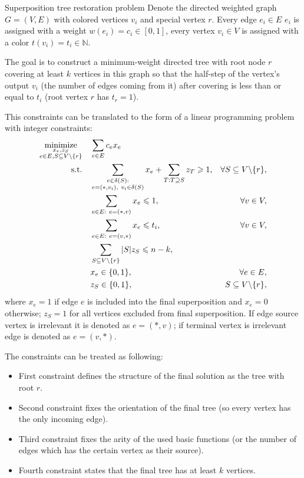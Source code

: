 \documentclass[11pt, tightenlines, twoside, onecolumn, nofloats, nobibnotes, nofootinbib, superscriptaddress, noshowpacks, centertags]{revtex4}
\begin{document}
\begin{definition}{Superposition tree restoration problem}
Denote the directed weighted graph $G=(V,E)$ with colored vertices $v_i$ and special vertex $r$. Every edge $e_i\in E$ $e_i$ is assigned with a weight $w(e_i)=c_i\in[0,1]$, every vertex $v_i \in V$ is assigned with a color  $t(v_i)=t_i\in\mathbb{N}$.

The goal is to construct a minimum-weight directed tree with root node $r$ covering at least $k$ vertices in this graph so that the half-step of the vertex's output $v_i$ (the number of edges coming from it) after covering is less than or equal to $t_i$ (root vertex $r$ has $t_r=1$).
\end{definition}
This constraints can be translated to the form of a linear programming problem with integer constraints:
\begin{align}
\underset{\substack{x_e,z_S \\ e\in E, S\subseteq V\backslash \{r\}}}{\text{minimize}}\quad & \sum\limits_{e\in E}c_ex_e \nonumber\\
\text{s.t.\quad} & \sum\limits_{\substack{e\in\delta(S):\\e=(\ast,v_i),~ v_i\in\delta(S)}}x_e + \sum\limits_{T:T\supseteq S}z_T\geqslant 1, & \forall S\subseteq V\backslash \{r\},\nonumber\\
& \sum\limits_{e\in E:~e=(\ast,v)}x_e\leqslant 1, & \forall v\in V,
\label{ilp_our}\\
& \sum\limits_{e\in E:~e=(v,\ast)}x_e\leqslant t_i, & \forall v\in V,\nonumber\\
& \sum\limits_{S\subseteq V\backslash \{r\}}|S|z_S \leqslant n-k,\nonumber\\
& x_e\in\{0,1\}, &\forall e\in E,\nonumber\\
& z_S\in\{0,1\}, & S\subseteq V\backslash \{r\},\nonumber
\end{align}
where $x_e = 1$ if edge $e$ is included into the final superposition and $x_e = 0$ otherwise; $z_S = 1$ for all vertices excluded from final superposition. If edge source vertex is irrelevant it is denoted as $e=(\ast, v)$; if terminal vertex is irrelevant edge is denoted as $e=(v, \ast)$.

The constraints can be treated as following:
\begin{itemize}
    \item First constraint defines the structure of the final solution as the tree with root $r$.
    \item Second constraint fixes the orientation of the final tree (so every vertex has the only incoming edge).
    \item Third constraint fixes the arity of the used basic functions (or the number of edges which has the certain vertex as their source).
    \item Fourth constraint states that the final tree has at least $k$ vertices.
\end{itemize}
\end{document}

